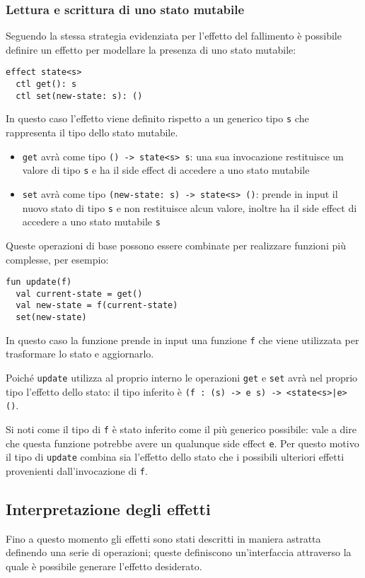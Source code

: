 \subsubsection{Lettura e scrittura di uno stato mutabile}
Seguendo la stessa strategia evidenziata per l'effetto del fallimento è possibile definire un effetto per modellare la presenza di uno stato mutabile:
\begin{lstlisting}[language=koka]
effect state<s>
  ctl get(): s
  ctl set(new-state: s): ()
\end{lstlisting}

In questo caso l'effetto viene definito rispetto a un generico tipo \lstinline{s} che rappresenta il tipo dello stato mutabile.
\begin{itemize}
  \item \lstinline{get} avrà come tipo \lstinline{() -> state<s> s}: una sua invocazione restituisce un valore di tipo \lstinline{s} e ha il side effect di accedere a uno stato mutabile
  \item \lstinline{set} avrà come tipo \lstinline{(new-state: s) -> state<s> ()}: prende in input il nuovo stato di tipo \lstinline{s} e non restituisce alcun valore, inoltre ha il side effect di accedere a uno stato mutabile \lstinline{s}
\end{itemize}

Queste operazioni di base possono essere combinate per realizzare funzioni più complesse, per esempio:
\begin{lstlisting}[language=koka]
fun update(f)
  val current-state = get()
  val new-state = f(current-state)
  set(new-state)
\end{lstlisting}
In questo caso la funzione prende in input una funzione \lstinline{f} che viene utilizzata per trasformare lo stato e aggiornarlo.

Poiché \lstinline{update} utilizza al proprio interno le operazioni \lstinline{get} e \lstinline{set} avrà nel proprio tipo l'effetto dello stato: il tipo inferito è \lstinline{(f : (s) -> e s) -> <state<s>|e> ()}.

Si noti come il tipo di \lstinline{f} è stato inferito come il più generico possibile: vale a dire che questa funzione potrebbe avere un qualunque side effect \lstinline{e}.
Per questo motivo il tipo di \lstinline{update} combina sia l'effetto dello stato che i possibili ulteriori effetti provenienti dall'invocazione di \lstinline{f}.

\subsection{Interpretazione degli effetti}
Fino a questo momento gli effetti sono stati descritti in maniera astratta definendo una serie di operazioni; queste definiscono un'interfaccia attraverso la quale è possibile generare l'effetto desiderato.

